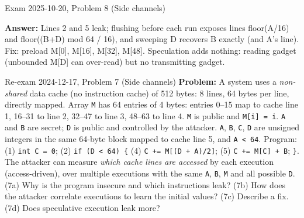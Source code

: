 \documentclass[12pt, a4paper]{article}
\begin{document}
\begin{practicebox}{Exam 2025-10-20, Problem 8 (Side channels)}
\begin{itemize}
\end{itemize}
\textbf{Answer:} Lines 2 and 5 leak; flushing before each run exposes lines floor(A/16) and floor((B+D) mod 64 / 16), and sweeping D recovers B exactly (and A's line). Fix: preload M[0], M[16], M[32], M[48]. Speculation adds nothing: reading gadget (unbounded M[D] can over-read) but no transmitting gadget.
\end{practicebox}

\begin{practicebox}{Re-exam 2024-12-17, Problem 7 (Side channels)}
\textbf{Problem:} A system uses a \emph{non-shared} data cache (no instruction cache) of 512 bytes: 8 lines, 64 bytes per line, directly mapped. Array \texttt{M} has 64 entries of 4 bytes: entries 0--15 map to cache line 1, 16--31 to line 2, 32--47 to line 3, 48--63 to line 4. \texttt{M} is public and \texttt{M[i] = i}. \texttt{A} and \texttt{B} are secret; \texttt{D} is public and controlled by the attacker. \texttt{A}, \texttt{B}, \texttt{C}, \texttt{D} are unsigned integers in the same 64-byte block mapped to cache line 5, and \texttt{A < 64}. Program: (1) \texttt{int C = 0}; (2) \texttt{if (D < 64) \{} (4) \texttt{C += M[(D + A)/2]}; (5) \texttt{C += M[C] + B}; \texttt{\}}. The attacker can measure \emph{which cache lines are accessed} by each execution (access-driven), over multiple executions with the same \texttt{A}, \texttt{B}, \texttt{M} and all possible \texttt{D}. (7a) Why is the program insecure and which instructions leak? (7b) How does the attacker correlate executions to learn the initial values? (7c) Describe a fix. (7d) Does speculative execution leak more?


\end{practicebox}
\end{document}
